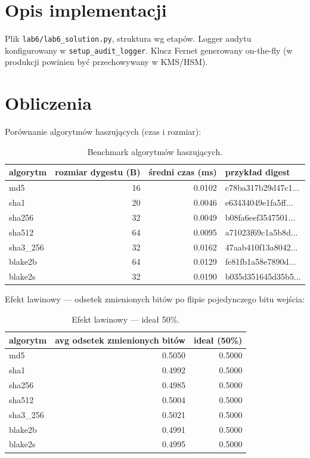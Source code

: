 \documentclass[12pt,a4paper]{article}
\begin{document}
\section{Opis implementacji}
Plik \texttt{lab6/lab6\_solution.py}, struktura wg etapów. Logger audytu konfigurowany w \texttt{setup\_audit\_logger}. Klucz Fernet generowany on-the-fly (w produkcji powinien być przechowywany w KMS/HSM).

\section{Obliczenia}
Porównanie algorytmów haszujących (czas i rozmiar):

\begin{table}[H]
\centering
\begin{tabular}{lrrl}
\toprule
algorytm & rozmiar dygestu (B) & średni czas (ms) & przykład digest \\
\midrule
md5 & 16 & 0.0102 & c78ba317b29d47c1... \\
sha1 & 20 & 0.0046 & e63434049e1fa5ff... \\
sha256 & 32 & 0.0049 & b08fa6eef3547501... \\
sha512 & 64 & 0.0095 & a71023f69c1a5b8d... \\
sha3\_256 & 32 & 0.0162 & 47aab410f13a8042... \\
blake2b & 64 & 0.0129 & fe81fb1a58e7890d... \\
blake2s & 32 & 0.0190 & b035d351645d35b5... \\
\bottomrule
\end{tabular}

\caption{Benchmark algorytmów haszujących.}
\label{tab:hbench}
\end{table}

Efekt lawinowy --- odsetek zmienionych bitów po flipie pojedynczego bitu wejścia:

\begin{table}[H]
\centering
\begin{tabular}{lrr}
\toprule
algorytm & avg odsetek zmienionych bitów & ideał (50\%) \\
\midrule
md5 & 0.5050 & 0.5000 \\
sha1 & 0.4992 & 0.5000 \\
sha256 & 0.4985 & 0.5000 \\
sha512 & 0.5004 & 0.5000 \\
sha3\_256 & 0.5021 & 0.5000 \\
blake2b & 0.4991 & 0.5000 \\
blake2s & 0.4995 & 0.5000 \\
\bottomrule
\end{tabular}

\caption{Efekt lawinowy --- ideał 50\%.}
\label{tab:aval}
\end{table}
\end{document}
